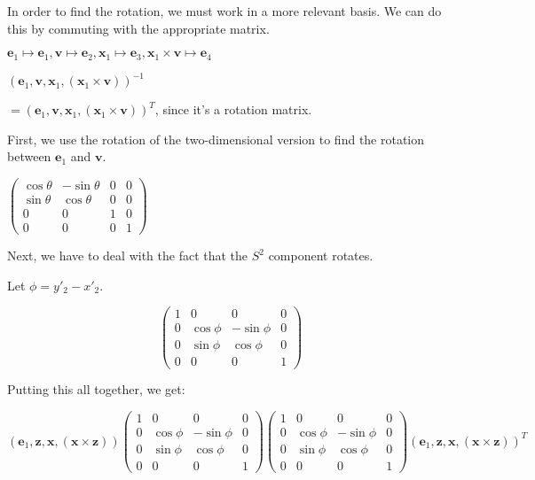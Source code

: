 \documentclass[12pt]{amsart}
\newcommand{\mat}[4]{\left(\begin{array}{ccc} #1 & #2 \\#3 & #4 \end{array} \right)}
\begin{document}
In order to find the rotation, we must work in a more relevant basis. We can do this by commuting with the appropriate matrix.

$\textbf{e}_1 \mapsto \textbf{e}_1, \textbf{v} \mapsto \textbf{e}_2, \textbf{x}_1 \mapsto \textbf{e}_3, \textbf{x}_1 \times \textbf{v} \mapsto \textbf{e}_4$

$(\textbf{e}_1, \textbf{v},\textbf{x}_1,(\textbf{x}_1 \times \textbf{v}))^{-1}$

$= (\textbf{e}_1, \textbf{v},\textbf{x}_1,(\textbf{x}_1 \times \textbf{v}))^T$, since it's a rotation matrix.

First, we use the rotation of the two-dimensional version to find the rotation between $\textbf{e}_1$ and $\textbf{v}$.


$\left(\begin{array}{cccc} \cos\theta & -\sin\theta & 0 & 0 \\ \sin\theta & \cos\theta & 0 & 0 \\ 0 & 0 & 1 & 0 \\ 0 & 0 & 0 & 1 \end{array} \right)$

Next, we have to deal with the fact that the $S^2$ component rotates.

Let $\phi = y'_2-x'_2$.

$$\left(\begin{array}{cccc} 1 & 0 & 0 & 0 \\ 0 & \cos\phi & -\sin\phi & 0 \\ 0 & \sin\phi & \cos\phi & 0 \\ 0 & 0 & 0 & 1 \end{array} \right)$$

Putting this all together, we get:

$$(\textbf{e}_1,\textbf{z},\textbf{x},(\textbf{x} \times \textbf{z}))
\left(\begin{array}{cccc} 1 & 0 & 0 & 0 \\ 0 & \cos\phi & -\sin\phi & 0 \\ 0 & \sin\phi & \cos\phi & 0 \\ 0 & 0 & 0 & 1 \end{array} \right)
\left(\begin{array}{cccc} 1 & 0 & 0 & 0 \\ 0 & \cos\phi & -\sin\phi & 0 \\ 0 & \sin\phi & \cos\phi & 0 \\ 0 & 0 & 0 & 1 \end{array} \right)
(\textbf{e}_1,\textbf{z},\textbf{x},(\textbf{x} \times \textbf{z}))^T$$
\end{document}
